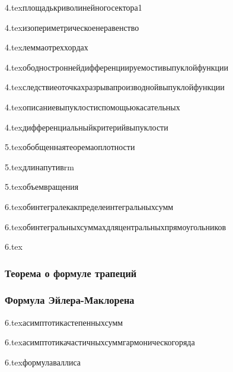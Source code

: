 {4.tex}{площадькриволинейногосектора1}

{4.tex}{изопериметрическоенеравенство}

{4.tex}{леммаотреххордах}

{4.tex}{ободностроннейдифференциируемостивыпуклойфункции}

{4.tex}{следствиеоточкахразрывапроизводнойвыпуклойфункции}

{4.tex}{описаниевыпуклостиспомощьюкасательных}

{4.tex}{дифференциальныйкритерийвыпуклости}

{5.tex}{обобщеннаятеоремаоплотности}

{5.tex}{длинапутивrm}

{5.tex}{объемвращения}

{6.tex}{обинтегралекакпределеинтегральныхсумм}

{6.tex}{обинтегральныхсуммахдляцентральныхпрямоугольников}

{6.tex}{}
\subsubsection{Теорема о формуле трапеций}
\subsubsection{Формула Эйлера-Маклорена}

{6.tex}{асимптотикастепенныхсумм}

{6.tex}{асимптотикачастичныхсуммгармоническогоряда}

{6.tex}{формулаваллиса}

